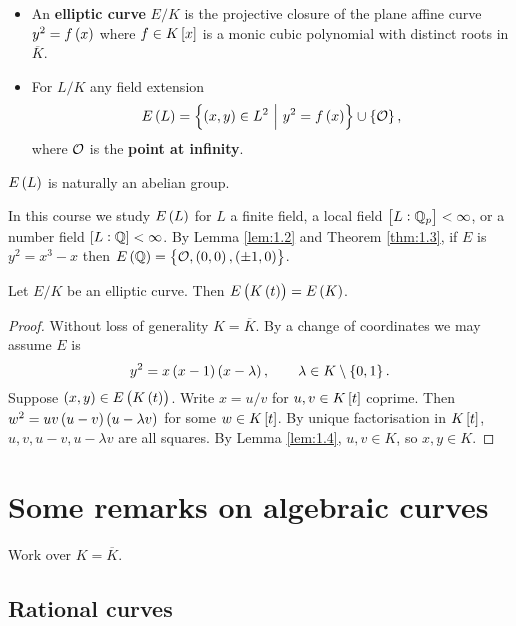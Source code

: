 \begin{definition}
\label{def:1.5}
\hfill
\begin{itemize}
\item An \textbf{elliptic curve} $ E / K $ is the projective closure of the plane affine curve $ y^2 = f\br{x} $ where $ f \in K\sbr{x} $ is a monic cubic polynomial with distinct roots in $ \overline{K} $.
\item For $ L / K $ any field extension
$$ E\br{L} = \cbr{\br{x, y} \in L^2 \st y^2 = f\br{x}} \cup \cbr{\OOO}, $$
where $ \mathcal{O} $ is the \textbf{point at infinity}.
\end{itemize}
\end{definition}

\begin{fact*}
$ E\br{L} $ is naturally an abelian group.
\end{fact*}

In this course we study $ E\br{L} $ for $ L $ a finite field, a local field $ \sbr{L : \QQ_p} < \infty $, or a number field $ \sbr{L : \QQ} < \infty $. By Lemma \ref{lem:1.2} and Theorem \ref{thm:1.3}, if $ E $ is $ y^2 = x^3 - x $ then $ E\br{\QQ} = \cbr{\OOO, \br{0, 0}, \br{\pm 1, 0}} $.

\begin{corollary}
\label{cor:1.6}
Let $ E / K $ be an elliptic curve. Then $ E\br{K\br{t}} = E\br{K} $.
\end{corollary}

\begin{proof}
Without loss of generality $ K = \overline{K} $. By a change of coordinates we may assume $ E $ is
$$ y^2 = x\br{x - 1}\br{x - \lambda}, \qquad \lambda \in K \setminus \cbr{0, 1}. $$
Suppose $ \br{x, y} \in E\br{K\br{t}} $. Write $ x = u / v $ for $ u, v \in K\sbr{t} $ coprime. Then $ w^2 = uv\br{u - v}\br{u - \lambda v} $ for some $ w \in K\sbr{t} $. By unique factorisation in $ K\sbr{t} $, $ u, v, u - v, u - \lambda v $ are all squares. By Lemma \ref{lem:1.4}, $ u, v \in K $, so $ x, y \in K $.
\end{proof}

\pagebreak

\section{Some remarks on algebraic curves}


Work over $ K = \overline{K} $.

\subsection{Rational curves}

